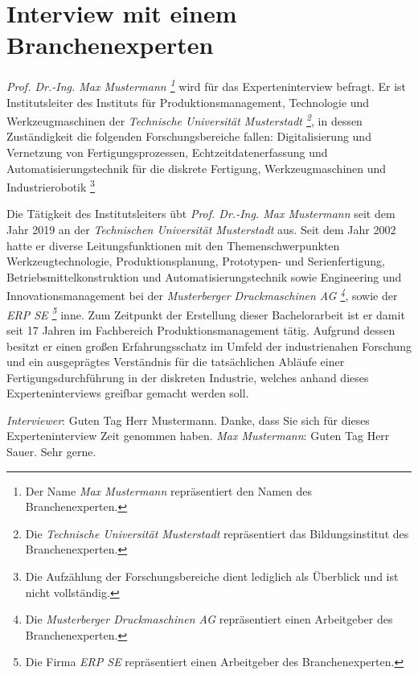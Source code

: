 \tocless\section{Interview mit einem Branchenexperten}\label{ah:interviewTUD}

\textit{Prof. Dr.-Ing. Max Mustermann \footnote{Der Name \textit{Max Mustermann} repräsentiert den Namen des Branchenexperten.}} wird für das Experteninterview befragt.
Er ist Institutsleiter des Instituts für Produktionsmanagement, Technologie und Werkzeugmaschinen der \textit{Technische Universität Musterstadt \footnote{Die \textit{Technische Universität Musterstadt} repräsentiert das Bildungsinstitut des Branchenexperten.}}, in dessen Zuständigkeit die folgenden Forschungsbereiche fallen: Digitalisierung und Vernetzung von Fertigungsprozessen, Echtzeitdatenerfassung und Automatisierungstechnik für die diskrete Fertigung, Werkzeugmaschinen und Industrierobotik \footnote{Die Aufzählung der Forschungsbereiche dient lediglich als Überblick und ist nicht vollständig.}

Die Tätigkeit des Institutsleiters übt \textit{Prof. Dr.-Ing. Max Mustermann} seit dem Jahr 2019 an der \textit{Technischen Universität Musterstadt} aus. Seit dem Jahr 2002 hatte er diverse Leitungsfunktionen mit den Themenschwerpunkten Werkzeugtechnologie, Produktionsplanung, Prototypen- und Serienfertigung, Betriebsmittelkonstruktion und Automatisierungstechnik sowie Engineering und Innovationsmanagement bei der \textit{Musterberger Druckmaschinen AG \footnote{Die \textit{Musterberger Druckmaschinen AG} repräsentiert einen Arbeitgeber des Branchenexperten.}}, sowie der \textit{ERP SE \footnote{Die Firma \textit{ERP SE} repräsentiert einen Arbeitgeber des Branchenexperten.}} inne. Zum Zeitpunkt der Erstellung dieser Bachelorarbeit ist er damit seit 17 Jahren im Fachbereich Produktionsmanagement tätig. Aufgrund dessen besitzt er einen großen Erfahrungsschatz im Umfeld der industrienahen Forschung und ein ausgeprägtes Verständnis für die tatsächlichen Abläufe einer Fertigungsdurchführung in der diskreten Industrie, welches anhand dieses Experteninterviews greifbar gemacht werden soll.

\textit{Interviewer}: Guten Tag Herr Mustermann. Danke, dass Sie sich für dieses Experteninterview Zeit genommen haben.
\newline
\textit{Max Mustermann}: Guten Tag Herr Sauer. Sehr gerne.


